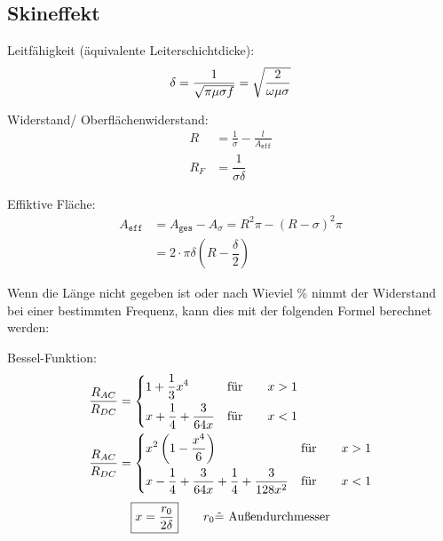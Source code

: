 \subsection{Skineffekt}

\begin{description}
    \item Leitfähigkeit (äquivalente Leiterschichtdicke):
        \[
            \delta = \frac{1}{\sqrt{\pi\mu\sigma f}} = \sqrt{\frac{2}{\omega\mu\sigma}} \\
        \]

    \item Widerstand/ Oberflächenwiderstand:
        \begin{align*}
            R &= \frac{1}{\sigma} - \frac{l}{A_{\texttt{eff}}}\\
            R_F &= \dfrac{1}{\sigma \delta}
        \end{align*}
              
    \item Effiktive Fläche:
        \begin{align*}
              A_{\texttt{eff}} & = A_{\texttt{ges}} - A_{\sigma} = R^2\pi-(R-\sigma)^2\pi \\
                               & =2\cdot \pi \delta \left( R-\dfrac{\delta }{2}\right)
        \end{align*}
\end{description}

Wenn die Länge nicht gegeben ist oder nach Wieviel \% nimmt der Widerstand bei
einer bestimmten Frequenz, kann dies mit der folgenden Formel berechnet werden:

\begin{description}
    \item Bessel-Funktion:
          \begin{align*}
              \frac{R_{AC}}{R_{DC}} & =
              \begin{dcases}
                  1 + \frac{1}{3}x^4              & \text{für} \qquad x > 1 \\
                  x + \frac{1}{4} + \frac{3}{64x} & \text{für} \qquad x < 1 \\
              \end{dcases} \\
              \frac{R_{AC}}{R_{DC}} & =
              \begin{dcases}
                  x^2\left( 1-\frac{x^4}{6} \right)                               & \text{für} \qquad x > 1 \\
                  x- \frac{1}{4} + \frac{3}{64x} + \frac{1}{4} + \frac{3}{128x^2} & \text{für} \qquad x < 1 \\
              \end{dcases}
          \end{align*}
          \[
              \boxed{x=\frac{r_0}{2\delta}} \qquad r_0 \hat{=} \textnormal{ Außendurchmesser}
          \]
\end{description}
